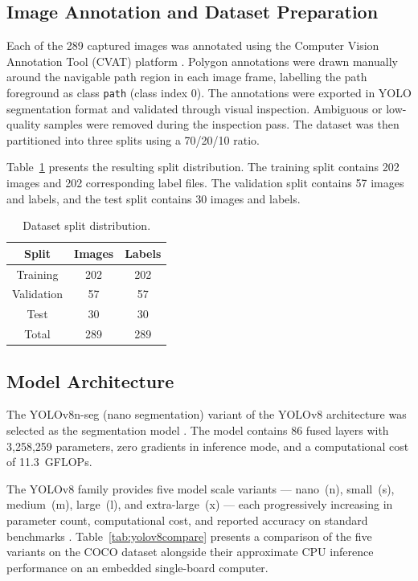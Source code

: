 \subsection{Image Annotation and Dataset Preparation}

Each of the 289 captured images was annotated using the
Computer Vision Annotation Tool (CVAT) platform \cite{r31}.
Polygon annotations were drawn manually around the navigable path
region in each image frame, labelling the path foreground as class
\texttt{path} (class index 0). The annotations were exported in YOLO
segmentation format and validated through visual inspection. Ambiguous
or low-quality samples were removed during the inspection pass. The
dataset was then partitioned into three splits using a 70/20/10 ratio.

Table~\ref{tab:split} presents the resulting split distribution. The
training split contains 202 images and 202 corresponding label files.
The validation split contains 57 images and labels, and the test split
contains 30 images and labels.

\begin{table}[tbp]
  \centering
  \caption{Dataset split distribution.}
  \label{tab:split}
  \begin{tabular}{ccc}
    \toprule
    Split      & Images & Labels \\
    \midrule
    Training   & 202    & 202 \\
    Validation & 57     & 57 \\
    Test       & 30     & 30 \\
    \midrule
    Total      & 289    & 289 \\
    \bottomrule
  \end{tabular}
\end{table}

\subsection{Model Architecture}

The YOLOv8n-seg (nano segmentation) variant of the YOLOv8
architecture was selected as the segmentation model \cite{r32}.
The model contains 86 fused layers with 3,258,259 parameters,
zero gradients in inference mode, and a computational cost of
11.3~GFLOPs.

The YOLOv8 family provides five model scale variants ---
nano~(n), small~(s), medium~(m), large~(l), and extra-large~(x)
--- each progressively increasing in parameter count, computational
cost, and reported accuracy on standard benchmarks \cite{r32}.
Table~\ref{tab:yolov8compare} presents a comparison of the five
variants on the COCO dataset alongside their approximate CPU inference
performance on an embedded single-board computer.

